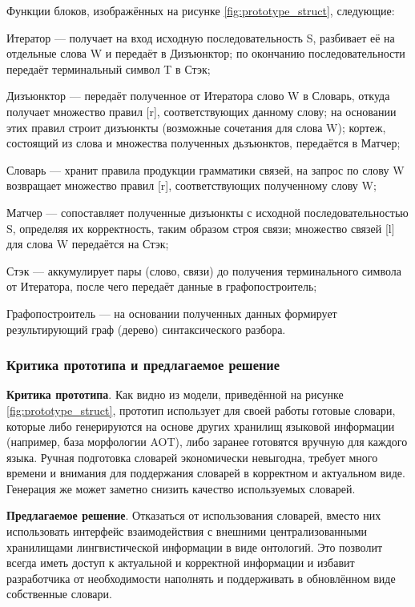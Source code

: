 Функции блоков, изображённых на рисунке \ref{fig:prototype_struct}, следующие:
\begin{list}{}{\leftmargin=1.5cm}
	\item Итератор --- получает на вход исходную последовательность S, разбивает её на отдельные слова W и передаёт в Дизъюнктор; по окончанию последовательности передаёт терминальный символ T в Стэк;
	\item Дизъюнктор --- передаёт полученное от Итератора слово W в Словарь, откуда получает множество правил [r], соответствующих данному слову; на основании этих правил строит дизъюнкты (возможные сочетания для слова W); кортеж, состоящий из слова и множества полученных дьзъюнктов, передаётся в Матчер;
	\item Словарь --- хранит правила продукции грамматики связей, на запрос по слову W возвращает множество правил [r], соответствующих полученному слову W;
	\item Матчер --- сопоставляет полученные дизъюнкты с исходной последовательностью S, определяя их корректность, таким образом строя связи; множество связей [l] для слова W передаётся на Стэк;
	\item Стэк --- аккумулирует пары (слово, связи) до получения терминального символа от Итератора, после чего передаёт данные в графопостроитель;
	\item Графопостроитель --- на основании полученных данных формирует результирующий граф (дерево) синтаксического разбора.
\end{list}

\subsubsection{Критика прототипа и предлагаемое решение}

\textbf{Критика прототипа}. Как видно из модели, приведённой на рисунке \ref{fig:prototype_struct}, прототип использует для своей работы готовые словари, которые либо  генерируются на основе других хранилищ языковой информации (например, база морфологии AOT), либо заранее готовятся вручную для каждого языка. Ручная подготовка словарей экономически невыгодна, требует много времени и внимания для поддержания словарей в корректном и актуальном виде. Генерация же может заметно снизить качество используемых словарей.

\textbf{Предлагаемое решение}. Отказаться от использования словарей, вместо них использовать интерфейс взаимодействия с внешними централизованными хранилищами лингвистической информации в виде онтологий. Это позволит всегда иметь доступ к актуальной и корректной информации и избавит разработчика от необходимости наполнять и поддерживать в обновлённом виде собственные словари.

